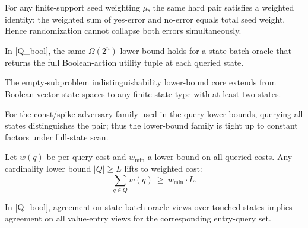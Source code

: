 \begin{proposition}\label{prop:query-randomized-weighted}
For any finite-support seed weighting $\mu$, the same hard pair satisfies a weighted identity:
the weighted sum of yes-error and no-error equals total seed weight. Hence randomization cannot collapse both errors simultaneously.
\end{proposition}

\begin{proposition}\label{prop:query-state-batch-lb}
In [Q\_bool], the same $\Omega(2^n)$ lower bound holds for a state-batch oracle that returns the full Boolean-action utility tuple at each queried state.
\end{proposition}

\begin{proposition}\label{prop:query-finite-state-generalization}
The empty-subproblem indistinguishability lower-bound core extends from Boolean-vector state spaces to any finite state type with at least two states.
\end{proposition}

\begin{proposition}\label{prop:query-tightness-full-scan}
For the const/spike adversary family used in the query lower bounds, querying all states distinguishes the pair; thus the lower-bound family is tight up to constant factors under full-state scan.
\end{proposition}

\begin{proposition}\label{prop:query-weighted-transfer}
Let $w(q)$ be per-query cost and $w_{\min}$ a lower bound on all queried costs.
Any cardinality lower bound $|Q|\geq L$ lifts to weighted cost:
\[
\sum_{q\in Q} w(q)\ \ge\ w_{\min}\cdot L.
\]
\end{proposition}

\begin{proposition}\label{prop:oracle-lattice-transfer}
In [Q\_bool], agreement on state-batch oracle views over touched states implies agreement on all value-entry views for the corresponding entry-query set.
\end{proposition}

